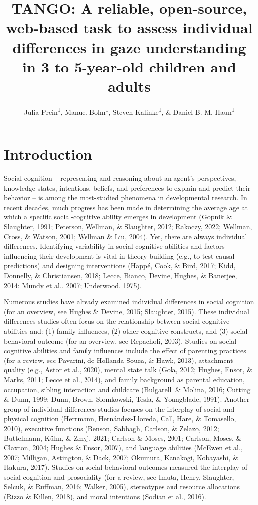 \documentclass[
  man,floatsintext]{apa6}
\title{TANGO: A reliable, open-source, web-based task to assess individual differences in gaze understanding in 3 to 5-year-old children and adults}
\author{Julia Prein\textsuperscript{1}, Manuel Bohn\textsuperscript{1}, Steven Kalinke\textsuperscript{1}, \& Daniel B. M. Haun\textsuperscript{1}}
\date{}
\affiliation{\vspace{0.5cm}\textsuperscript{1} Department of Comparative Cultural Psychology, Max Planck Institute for Evolutionary Anthropology, Leipzig, Germany}
\begin{document}
\maketitle

\hypertarget{introduction}{%
\section{Introduction}\label{introduction}}

Social cognition -- representing and reasoning about an agent's perspectives, knowledge states, intentions, beliefs, and preferences to explain and predict their behavior -- is among the most-studied phenomena in developmental research.
In recent decades, much progress has been made in determining the average age at which a specific social-cognitive ability emerges in development (Gopnik \& Slaughter, 1991; Peterson, Wellman, \& Slaughter, 2012; Rakoczy, 2022; Wellman, Cross, \& Watson, 2001; Wellman \& Liu, 2004). Yet, there are always individual differences. Identifying variability in social-cognitive abilities and factors influencing their development is vital in theory building (e.g., to test causal predictions) and designing interventions (Happé, Cook, \& Bird, 2017; Kidd, Donnelly, \& Christiansen, 2018; Lecce, Bianco, Devine, Hughes, \& Banerjee, 2014; Mundy et al., 2007; Underwood, 1975).

Numerous studies have already examined individual differences in social cognition (for an overview, see Hughes \& Devine, 2015; Slaughter, 2015). These individual differences studies often focus on the relationship between social-cognitive abilities and: (1) family influences, (2) other cognitive constructs, and (3) social behavioral outcome (for an overview, see Repacholi, 2003). Studies on social-cognitive abilities and family influences include the effect of parenting practices (for a review, see Pavarini, de Hollanda Souza, \& Hawk, 2013), attachment quality (e.g., Astor et al., 2020), mental state talk (Gola, 2012; Hughes, Ensor, \& Marks, 2011; Lecce et al., 2014), and family background as parental education, occupation, sibling interaction and childcare (Bulgarelli \& Molina, 2016; Cutting \& Dunn, 1999; Dunn, Brown, Slomkowski, Tesla, \& Youngblade, 1991). Another group of individual differences studies focuses on the interplay of social and physical cognition (Herrmann, Hernández-Lloreda, Call, Hare, \& Tomasello, 2010), executive functions (Benson, Sabbagh, Carlson, \& Zelazo, 2012; Buttelmann, Kühn, \& Zmyj, 2021; Carlson \& Moses, 2001; Carlson, Moses, \& Claxton, 2004; Hughes \& Ensor, 2007), and language abilities (McEwen et al., 2007; Milligan, Astington, \& Dack, 2007; Okumura, Kanakogi, Kobayashi, \& Itakura, 2017). Studies on social behavioral outcomes measured the interplay of social cognition and prosociality (for a review, see Imuta, Henry, Slaughter, Selcuk, \& Ruffman, 2016; Walker, 2005), stereotypes and resource allocations (Rizzo \& Killen, 2018), and moral intentions (Sodian et al., 2016).
\end{document}
